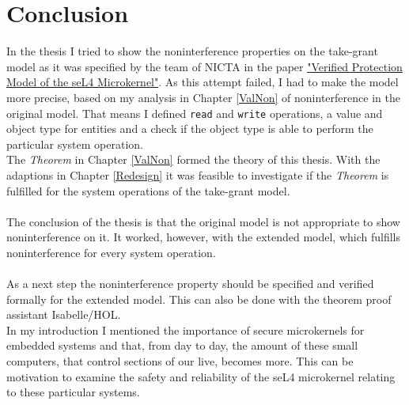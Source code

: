 \chapter{Conclusion}
In the thesis I tried to show the noninterference properties on the take-grant model as it was specified by the team of NICTA in the paper \href{http://ts.data61.csiro.au/publications/nicta_full_text/1474.pdf}{%
		"Verified Protection Model of the seL4 Microkernel"}\cite{TakeG}. As this attempt failed, I had to make the model more precise, based on my analysis in Chapter \ref{ValNon} of noninterference in the original model. That means I defined \texttt{read} and \texttt{write} operations, a value and object type for entities and a check if the object type is able to perform the particular system operation. \\
		The \textit{Theorem} in Chapter \ref{ValNon} formed the theory of this thesis. 
		With the adaptions in Chapter \ref{Redesign} it was feasible to investigate if the \textit{Theorem} is fulfilled for the system operations of the take-grant model. \\ \\
		The conclusion of the thesis is that the original model is not appropriate to show noninterference on it. It worked, however, with the extended model, which fulfills noninterference for every system operation.\\ \\
		As a next step the noninterference property should be specified and verified formally for the extended model. This can also be done with the theorem proof assistant Isabelle/HOL.  \\
		In my introduction I mentioned the importance of secure microkernels for embedded systems and that, from day to day, the amount of these small computers, that control sections of our live, becomes more. This can be motivation to examine the safety and reliability of the seL4 microkernel relating to these particular systems. 